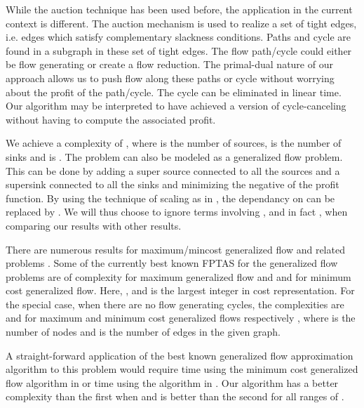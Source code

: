 \documentclass[11pt]{article}
\begin{document}
While the auction technique has been used before, the application in the current context
is different.  The auction mechanism is used to realize a set of tight edges, i.e. edges 
which satisfy complementary slackness conditions. Paths and cycle are found in a subgraph 
in these set of tight edges. The flow path/cycle could either be flow generating or 
create a flow reduction. The primal-dual nature of our approach allows us to push flow 
along these paths or cycle without worrying about the profit of the path/cycle. The cycle 
can be eliminated in linear time. Our algorithm may be interpreted to have achieved a  
version of cycle-canceling \cite{wayne99apolynomial} without having to compute 
the associated profit.

We achieve a complexity of , 
where  is the number of sources,  is the number of sinks and  is
.
The problem can also be modeled as a generalized flow problem.
This can be done by adding a super source connected to all the sources and a supersink
connected to all the sinks and minimizing the negative of the profit function. 
By using the technique of scaling as in \cite{Luby-Nisan},
the dependancy on  can be replaced by  .
We will thus choose to ignore terms involving , and in fact
, when comparing our results with other results.


There are numerous results 
for maximum/mincost generalized flow and related problems 
\cite{tardos98simple,fleischer99fast,wayne99apolynomial,radzik98faster,oldham99combinatorial,
goldberg91combinatorial,goldfarb96afaster}. 
Some of the currently best known FPTAS for the generalized flow problems
are of complexity  
\cite{fleischer99fast,tardos98simple,radzik98faster} 
for 
maximum  generalized flow and  \cite{fleischer99fast} and 
 \cite{wayne99apolynomial} for minimum 
cost generalized flow. Here, ,  and  is 
the largest integer in cost representation. For the special case, when 
there are no flow generating cycles, the complexities are 
 and 
for maximum and minimum cost generalized flows respectively \cite{fleischer99fast}, where
 is the number of nodes and  is the number of edges in the given graph.


A straight-forward application of the best known generalized flow approximation
algorithm to this problem would require  time
using the minimum cost generalized flow algorithm in \cite{wayne99apolynomial}  
or  time using the algorithm in \cite{fleischer99fast}. 
Our algorithm has a better complexity than the first when
 and is better than the second for all ranges of .
\end{document}
